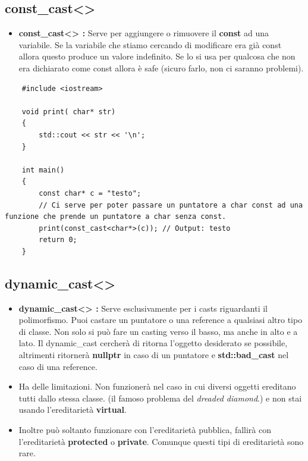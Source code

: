 \subsection{const\_cast<>}

\begin{itemize}
	\item \textsf{\small \textbf{const\_cast<> :} Serve per aggiungere o rimuovere il \textbf{const} ad una variabile. Se la variabile che stiamo cercando di modificare era già const allora questo produce un valore indefinito. Se lo si usa per qualcosa che non era dichiarato come const allora è safe (sicuro farlo, non ci saranno problemi).  }
\end{itemize}

\begin{lstlisting}
	#include <iostream>
	
	void print( char* str)
	{
		std::cout << str << '\n';
	}

	int main()
	{
		const char* c = "testo";
		// Ci serve per poter passare un puntatore a char const ad una funzione che prende un puntatore a char senza const.
		print(const_cast<char*>(c)); // Output: testo
		return 0;
	}
\end{lstlisting}

\subsection{dynamic\_cast<>}

\begin{itemize}
	\item \textsf{\small \textbf{dynamic\_cast<> :} Serve esclusivamente per i casts riguardanti il polimorfismo. Puoi castare un puntatore o una reference a qualsiasi altro tipo di classe. Non solo si può fare un casting verso il basso, ma anche in alto e a lato. Il dynamic\_cast cercherà di ritorna l'oggetto desiderato se possibile, altrimenti ritornerà \textbf{nullptr} in caso di un puntatore e \textbf{std::bad\_cast} nel caso di una reference.}
	\item \textsf{\small Ha delle limitazioni. Non funzionerà nel caso in cui diversi oggetti ereditano tutti dallo stessa classe. (il famoso problema del \emph{dreaded diamond}.) e non stai usando l'ereditarietà \textbf{virtual}.}
	\item \textsf{\small Inoltre può soltanto funzionare con l'ereditarietà pubblica, fallirà con l'ereditarietà \textbf{protected} o \textbf{private}. Comunque questi tipi di ereditarietà sono rare.}
\end{itemize}

